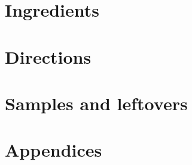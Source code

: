 \documentclass[10pt]{report}
\begin{document}






\part{Ingredients}
\label{part:ing}









\part{Directions}
\label{part:dir}



\part{Samples and leftovers}
\label{part:samp}







\printbibliography

\appendix

\part{Appendices}


\end{document}
